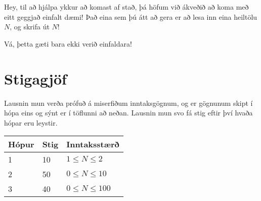 
Hey, til að hjálpa ykkur að komast af stað, þá höfum við ákveðið að koma með
eitt geggjað einfalt dæmi! Það eina sem þú átt að gera er að lesa inn eina
heiltölu $N$, og skrifa út $N!$

Vá, þetta gæti bara ekki verið einfaldara!

\section*{Stigagjöf}
Lausnin mun verða prófuð á miserfiðum inntaksgögnum, og er gögnunum skipt í
hópa eins og sýnt er í töflunni að neðan. Lausnin mun svo fá stig eftir því
hvaða hópar eru leystir.

\begin{tabular}{|l|l|l|}
\hline
Hópur & Stig & Inntaksstærð  \\ \hline
1     & 10   & $1 \le N \le 2$ \\ \hline
2     & 50   & $0 \le N \le 10$ \\ \hline
3     & 40   & $0 \le N \le 100$ \\ \hline
\end{tabular}
